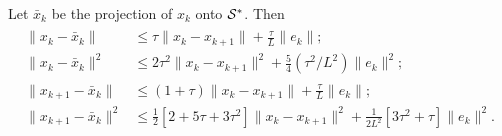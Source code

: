 \begin{lem}\label{lem:fourbounds} Let $\bar{x}_k$ be the projection 
of $x_k$ onto $\mathcal{S^*}$. Then
\begin{subequations}
\begin{align} 
  \|x_{k}-\bar{x}_k\|^{\phantom2}
  &\leq\tau\|x_{k}-x_{k+1}\|+\frac{\tau}{L}\|e_{k}\|;
  \label{eq:a1a}
\\ \|x_{k}-\bar{x}_k\|^{2} 
  &\leq2\tau^{2}\|x_{k}-x_{k+1}\|^{2}
  +\frac{5}{4}(\tau^{2}/L^{2})\|e_{k}\|^{2};
  \label{eq:a1b}
\\ \|x_{k+1}-\bar{x}_k\|^{\phantom2} 
  & \leq(1+\tau)\|x_{k}-x_{k+1}\|+\frac{\tau}{L}\|e_{k}\|;
  \label{eq:a1c}
\\ \|x_{k+1}-\bar{x}_k\|^{2} & 
  \leq\frac{1}{2}[2+5\tau+3\tau^{2}]\|x_{k}-x_{k+1}\|^{2}
  +\tfrac{1}{2L^{2}}[3\tau^{2}+\tau]\|e_{k}\|^{2}.
  \label{eq:a1d}
\end{align}
\end{subequations}
\end{lem}
